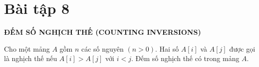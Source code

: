 \documentclass[12pt, a4paper, fleqn]{article}
\begin{document}
	\clearpage
	
	\section*{Bài tập 8}
	
	
	\textbf{ĐẾM SỐ NGHỊCH THẾ (COUNTING INVERSIONS)}
	
	Cho một mảng $A$ gồm $n$ các số nguyên $(n > 0)$. Hai số $A[i]$ và $A[j]$ được gọi là nghịch thế nếu $A[i] > A[j]$ với $i < j$. Đếm số nghịch thế có trong mảng $A$.
	
\end{document}
